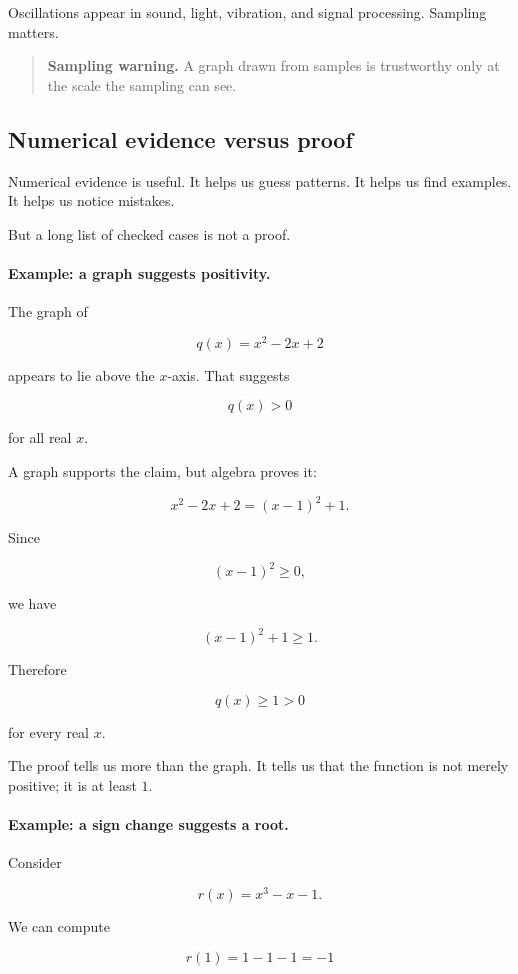  Oscillations appear in sound, light, vibration, and signal processing. Sampling matters.

\begin{quote}
\textbf{Sampling warning.}
A graph drawn from samples is trustworthy only at the scale the sampling can see.
\end{quote}

\subsection{Numerical evidence versus proof}
\label{subsec:numerical-evidence-versus-proof}

Numerical evidence is useful. It helps us guess patterns. It helps us find examples. It helps us notice mistakes.

But a long list of checked cases is not a proof.

\paragraph{Example: a graph suggests positivity.}
The graph of

\[
q(x)=x^2-2x+2
\]

appears to lie above the \(x\)-axis. That suggests

\[
q(x)>0
\]

for all real \(x\).

A graph supports the claim, but algebra proves it:

\[
x^2-2x+2
=
(x-1)^2+1.
\]

Since

\[
(x-1)^2\ge0,
\]

we have

\[
(x-1)^2+1\ge1.
\]

Therefore

\[
q(x)\ge1>0
\]

for every real \(x\).

The proof tells us more than the graph. It tells us that the function is not merely positive; it is at least \(1\).

\paragraph{Example: a sign change suggests a root.}
Consider

\[
r(x)=x^3-x-1.
\]

We can compute

\[
r(1)=1-1-1=-1
\]

